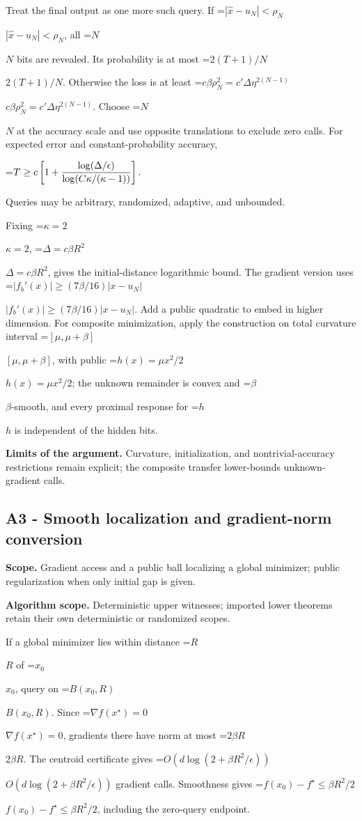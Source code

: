 \documentclass[10pt,a4paper]{article}
\newcommand{\AtlasMath}[1]{\par\begingroup\centering\setbox0=\hbox{$\displaystyle #1$}\ifdim\wd0>1.4\linewidth\typeout{ATLAS WIDE FORMULA: \the\wd0}\fi\ifdim\wd0>\linewidth\resizebox{\linewidth}{!}{\box0}\else\box0\fi\par\endgroup}
\newcommand{\AtlasInlineMath}[1]{\begingroup\setbox0=\hbox{$#1$}\ifdim\wd0>.4\linewidth\endgroup\AtlasMath{#1}\else\endgroup$#1$\fi}
\begin{document}
Treat the final output as one more such query. If \AtlasInlineMath{|\widehat x-u_N|<\rho_N}, all \AtlasInlineMath{N} bits are revealed. Its probability is at most \AtlasInlineMath{2(T+1)/N}. Otherwise the loss is at least
\AtlasInlineMath{c\beta\rho_N^2=c'\Delta\eta^{2(N-1)}}.
Choose \AtlasInlineMath{N} at the accuracy scale and use opposite translations to exclude zero calls. For expected error and constant-probability accuracy,

\AtlasMath{T\ge c\left[1+{\log(\Delta/\epsilon)\over
\log(C\kappa/(\kappa-1))}\right].}

Queries may be arbitrary, randomized, adaptive, and unbounded.

Fixing \AtlasInlineMath{\kappa=2}, \AtlasInlineMath{\Delta=c\beta R^2}, gives the initial-distance logarithmic bound. The gradient version uses
\AtlasInlineMath{|f_b'(x)|\ge(7\beta/16)|x-u_N|}.
Add a public quadratic to embed in higher dimension. For composite minimization, apply the construction on total curvature interval \AtlasInlineMath{[\mu,\mu+\beta]}, with public \AtlasInlineMath{h(x)=\mu x^2/2}; the unknown remainder is convex and \AtlasInlineMath{\beta}-smooth, and every proximal response for \AtlasInlineMath{h} is independent of the hidden bits.

\textbf{Limits of the argument.} Curvature, initialization, and nontrivial-accuracy restrictions remain explicit; the composite transfer lower-bounds unknown-gradient calls.

\subsection{A3 - Smooth localization and gradient-norm conversion}
\textbf{Scope.} Gradient access and a public ball localizing a global minimizer; public regularization when only initial gap is given.

\textbf{Algorithm scope.} Deterministic upper witnesses; imported lower theorems retain their own deterministic or randomized scopes.

If a global minimizer lies within distance \AtlasInlineMath{R} of \AtlasInlineMath{x_0}, query on \AtlasInlineMath{B(x_0,R)}. Since \AtlasInlineMath{\nabla f(x^\star)=0}, gradients there have norm at most \AtlasInlineMath{2\beta R}. The centroid certificate gives \AtlasInlineMath{O(d\log(2+\beta R^2/\epsilon))} gradient calls. Smoothness gives \AtlasInlineMath{f(x_0)-f^\star\le\beta R^2/2}, including the zero-query endpoint.
\end{document}
